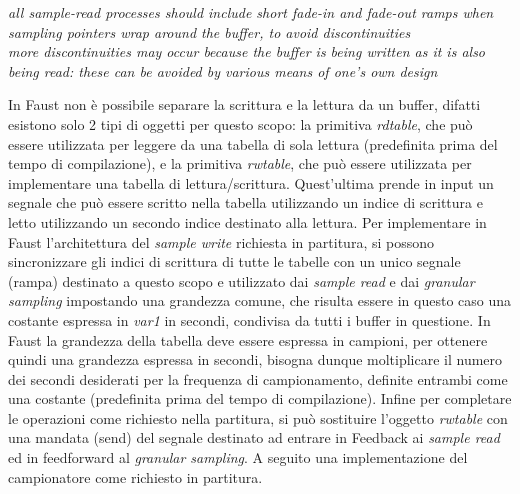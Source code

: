 \begin{center}
    \vspace{0.5cm}
    \textit{all sample-read processes 
    should include short fade-in and fade-out
    ramps when sampling pointers wrap around the buffer, to avoid
    discontinuities \\
    more discontinuities may occur because the buffer is being written
    as it is also being read: these can be avoided by various means of
    one's own design}
    \vspace{0.5cm}
\end{center}

In Faust non è possibile separare la scrittura e la lettura da un buffer,
difatti esistono solo 2 tipi di oggetti per questo scopo:
la primitiva \textit{rdtable}, che può essere utilizzata per leggere da una tabella di sola lettura 
(predefinita prima del tempo di compilazione),
e la primitiva \textit{rwtable}, che può essere utilizzata per implementare una tabella di lettura/scrittura. 
Quest'ultima prende in input un segnale che può essere scritto nella tabella utilizzando un indice di scrittura e 
letto utilizzando un secondo indice destinato alla lettura.
Per implementare in Faust l'architettura del \textit{sample write} richiesta in partitura, 
si possono sincronizzare gli indici di scrittura di tutte le tabelle con un unico 
segnale (rampa) destinato a questo scopo e utilizzato dai \textit{sample read} e dai \textit{granular sampling} 
impostando una grandezza comune, che risulta essere in questo caso una costante espressa in \textit{var1} in secondi, 
condivisa da tutti i buffer in questione.
In Faust la grandezza della tabella deve essere espressa in campioni, per ottenere quindi
una grandezza espressa in secondi, bisogna dunque moltiplicare il numero dei secondi desiderati per
la frequenza di campionamento, definite entrambi come una costante (predefinita prima del tempo di compilazione).
Infine per completare le operazioni come richiesto nella partitura, si può sostituire l'oggetto \textit{rwtable}
con una mandata (send) del segnale destinato ad entrare in Feedback ai \textit{sample read} ed in
feedforward al \textit{granular sampling}.
A seguito una implementazione del campionatore come richiesto in partitura.
\clearpage 

